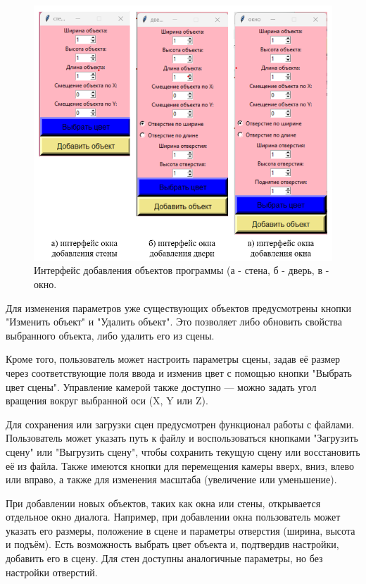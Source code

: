 \begin{figure}[H]
    \centering
    \includegraphics[width=1\textwidth]{img/add_interface.png}
    \caption{Интерфейс добавления объектов программы (а - стена, б - дверь, в - окно.}
    \label{fig:add_interface}
\end{figure}

Для изменения параметров уже существующих объектов предусмотрены кнопки "Изменить объект" и "Удалить объект". Это позволяет либо обновить свойства выбранного объекта, либо удалить его из сцены.

Кроме того, пользователь может настроить параметры сцены, задав её размер через соответствующие поля ввода и изменив цвет с помощью кнопки "Выбрать цвет сцены". Управление камерой также доступно — можно задать угол вращения вокруг выбранной оси (X, Y или Z).

Для сохранения или загрузки сцен предусмотрен функционал работы с файлами. Пользователь может указать путь к файлу и воспользоваться кнопками "Загрузить сцену" или "Выгрузить сцену", чтобы сохранить текущую сцену или восстановить её из файла. Также имеются кнопки для перемещения камеры вверх, вниз, влево или вправо, а также для изменения масштаба (увеличение или уменьшение).

При добавлении новых объектов, таких как окна или стены, открывается отдельное окно диалога. Например, при добавлении окна пользователь может указать его размеры, положение в сцене и параметры отверстия (ширина, высота и подъём). Есть возможность выбрать цвет объекта и, подтвердив настройки, добавить его в сцену. Для стен доступны аналогичные параметры, но без настройки отверстий.

